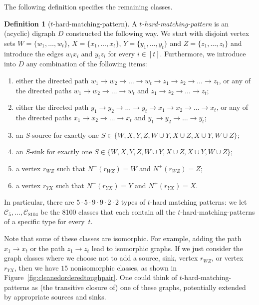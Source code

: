 \documentclass[a4paper,11pt]{article}
\theoremstyle{plain}
\newtheorem{identification rule}{Identification Rule}
\theoremstyle{definition}
\newtheorem{definition}[theorem]{Definition}
\theoremstyle{remark}
\newcommand{\hardmatching}[1]{$#1$-hard-matching-pattern}
\begin{document}
The following definition specifies the remaining classes. 
\begin{definition}[\hardmatching{t}]
\label{def:cleanedorderedtoughpair}
A \emph{\hardmatching{t}} is
an (acyclic) digraph $D$ constructed the following way. We start with disjoint vertex sets $W = \{w_1,\ldots,w_t\}$, $X = \{x_1,\ldots,x_t\}$, $Y = \{y_1,\ldots,y_t\}$ and $Z = \{z_1,\ldots,z_t\}$ and introduce the edges $w_ix_i$ and $y_iz_i$ for every $i\in[t]$.
Furthermore, we introduce into $D$ any combination of the following items:
\begin{enumerate}
\item either the directed path $w_1 \rightarrow w_2 \rightarrow \ldots \rightarrow w_t \rightarrow z_1 \rightarrow z_2 \rightarrow \ldots \rightarrow z_t$, or any of the directed paths $w_1 \rightarrow w_2 \rightarrow \ldots \rightarrow w_t$ and 
$z_1 \rightarrow z_2 \rightarrow \ldots \rightarrow z_t$;
\item either the directed path $y_1 \rightarrow y_2 \rightarrow \ldots \rightarrow y_t \rightarrow x_1 \rightarrow x_2 \rightarrow \ldots \rightarrow x_t$, or any of the directed paths $x_1 \rightarrow x_2 \rightarrow \ldots \rightarrow x_t$ and $y_1 \rightarrow y_2 \rightarrow \ldots \rightarrow y_t$;
\item an $S$-source for exactly one $S \in \{W,X,Y,Z,W \cup Y,X \cup Z,X \cup Y,W \cup Z\}$;
\item an $S$-sink for exactly one $S \in \{W,X,Y,Z,W \cup Y,X \cup Z,X \cup Y,W \cup Z\}$;
\item a vertex $r_{WZ}$ such that $N^-(r_{WZ}) = W$ and $N^+(r_{WZ}) = Z$;
\item a vertex $r_{YX}$ such that $N^-(r_{YX}) = Y$ and $N^+(r_{YX}) = X$.
\end{enumerate}
In particular, there are $5 \cdot 5 \cdot 9 \cdot 9 \cdot 2 \cdot 2$ types of $t$-hard matching patterns: we let $\mathcal{C}_5, \ldots, \mathcal{C}_{8104}$ be the 8100 classes that each contain all the $t$-hard-matching-patterns of a specific type for every~$t$.
\end{definition}
Note that some of these classes are isomorphic. For example, adding the path $x_1\to x_t$ or the path $z_1\to z_t$ lead to isomorphic graphs. If we just consider the graph classes where we choose not to add a source, sink, vertex $r_{WZ}$, or vertex $r_{YX}$, then we have $15$ nonisomorphic classes, as shown in Figure~\ref{fig:cleanedorderedtoughpair}. One could think of $t$-hard-matching-patterns as (the transitive closure of) one of these graphs, potentially extended by appropriate sources and sinks.
\end{document}
